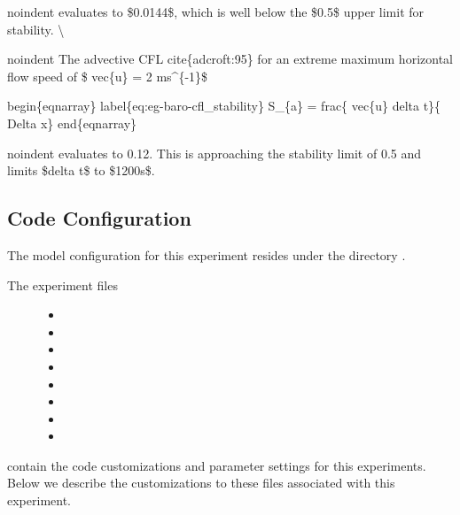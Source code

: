 \documentclass[letterpaper,10pt,english]{sphinxmanual}
\begin{document}
noindent evaluates to \$0.0144\$, which is well below the \$0.5\$ upper
limit for stability.
\textbackslash{}

noindent The advective CFL cite\{adcroft:95\} for an extreme maximum
horizontal flow speed of \$ \textbar{} vec\{u\} \textbar{} = 2 ms\textasciicircum{}\{-1\}\$

begin\{eqnarray\}
label\{eq:eg-baro-cfl\_stability\}
S\_\{a\} = frac\{\textbar{} vec\{u\} \textbar{} delta t\}\{ Delta x\}
end\{eqnarray\}

noindent evaluates to 0.12. This is approaching the stability limit
of 0.5 and limits \$delta t\$ to \$1200s\$.


\subsection{Code Configuration}
\label{\detokenize{examples/examples:code-configuration}}\label{\detokenize{examples/examples:sec-eg-baro-code-config}}
The model configuration for this experiment resides under the
directory .
\begin{description}
\item[{The experiment files}] \leavevmode\begin{itemize}
\item {} 

\item {} 

\item {} 

\item {} 

\item {} 

\item {} 

\item {} 

\item {} 

\end{itemize}

\end{description}

contain the code customizations and parameter settings for this
experiments. Below we describe the customizations
to these files associated with this experiment.
\end{document}
